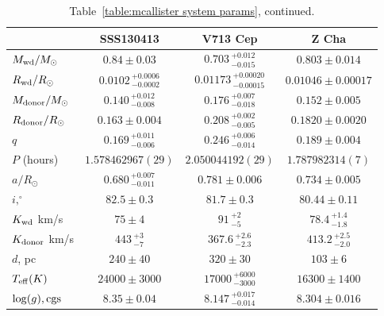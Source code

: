 \begin{landscape}
    \begin{table}
        \caption{Table~\ref{table:mcallister system params}, continued.}
        \label{table:mcallister system params cont 2}
        \begin{tabular}{lccc}
        \hline
        ~                               & \textbf{SSS130413}                & \textbf{V713 Cep}                 & \textbf{Z Cha}            \\
        \hline
        \hline
        $M_{\rm wd}/M_{\odot}$          & $0.84\pm0.03$                     & $0.703\,^{+0.012}_{-0.015}$       & $0.803\pm0.014$           \\
        $R_{\rm wd}/R_{\odot}$          & $0.0102\,^{+0.0006}_{-0.0002}$    & $0.01173\,^{+0.00020}_{-0.00015}$ & $0.01046\pm0.00017$       \\
        $M_{\rm donor}/M_{\odot}$       & $0.140\,^{+0.012}_{-0.008}$       & $0.176\,^{+0.007}_{-0.018}$       & $0.152\pm0.005$           \\
        $R_{\rm donor}/R_{\odot}$       & $0.163\pm0.004$                   & $0.208\,^{+0.002}_{-0.005}$       & $0.1820\pm0.0020$         \\
        $q$                             & $0.169\,^{+0.011}_{-0.006}$       & $0.246\,^{+0.006}_{-0.014}$       & $0.189\pm0.004$           \\
        \hline
        $P$ (hours)                      & $1.578462967(29)$                 & $2.050044192(29)$                 & $1.787982314(7)$          \\
        $a/R_{\odot}$                   & $0.680\,^{+0.007}_{-0.011}$       & $0.781\pm0.006$                   & $0.734\pm0.005$           \\
        $i, ^\circ$                     & $82.5\pm0.3$                      & $81.7\pm0.3$                      & $80.44\pm0.11$            \\
        $K_{\rm wd}$ km/s               & $75\pm4$                          & $91\,^{+2}_{-5}$                  & $78.4\,^{+1.4}_{-1.8}$    \\
        $K_{\rm donor}$ km/s            & $443\,^{+3}_{-7}$                 & $367.6\,^{+2.6}_{-2.3}$           & $413.2\,^{+2.5}_{-2.0}$   \\
        \hline
        $d$, pc                         & $240\pm40$                        & $320\pm30$                        & $103\pm6$                 \\
        $T_{\rm eff} (K)$               & $24000\pm3000$                    & $17000\,^{+6000}_{-3000}$         & $16300\pm1400$            \\
        $\log(g), {\rm cgs}$            & $8.35\pm0.04$                     & $8.147\,^{+0.017}_{-0.014}$       & $8.304\pm0.016$           \\
        \hline
        \hline
        \end{tabular}
        \end{table}



\end{landscape}
